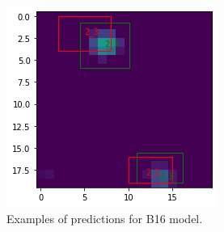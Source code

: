 \documentclass[a4paper,10pt]{report}
\begin{document}
\begin{figure}[!htb]
  \includegraphics[width=\linewidth]{b16_14365_16926_17629_20.png}
  \endminipage\hfill
  \caption{Examples of predictions for B16 model.}
  \label{fig:b16-pred}
\end{figure}
\end{document}
